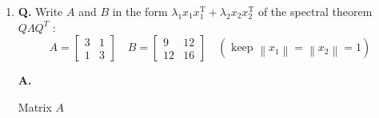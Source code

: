 \documentclass[main.tex]{subfiles}
\begin{document}
\begin{enumerate}
$$\begin{aligned}
\begin{array}{l}
    1 \\
    -2 \\
    -2
    \end{array}\right)\\
    &\pm \frac{1}{3}\left(\begin{array}{l}
    1 \\
    -2 \\
    -2
    \end{array}\right)\\
    Q&=\frac{1}{3}\left(\begin{array}{ccc}
    2 & 2 & 1 \\
    2 & -1 & -2 \\
    -1 & 2 & -2
    \end{array}\right)
    \end{aligned}
    $$
    
    \item [11.] \textbf{Q.} Write $A$ and $B$ in the form $\lambda_{1} x_{1} x_{1}^{\mathrm{T}}+\lambda_{2} x_{2} x_{2}^{\mathrm{T}}$ of the spectral theorem $Q \Lambda Q^{T}$ :
    $$
    A=\left[\begin{array}{ll}
    3 & 1 \\
    1 & 3
    \end{array}\right] \quad B=\left[\begin{array}{rr}
    9 & 12 \\
    12 & 16
    \end{array}\right] \quad\left(\text { keep }\left\|x_{1}\right\|=\left\|x_{2}\right\|=1\right)
    $$
    
    \textbf{A.}

    Matrix $A$
    

\end{enumerate}
\end{document}
